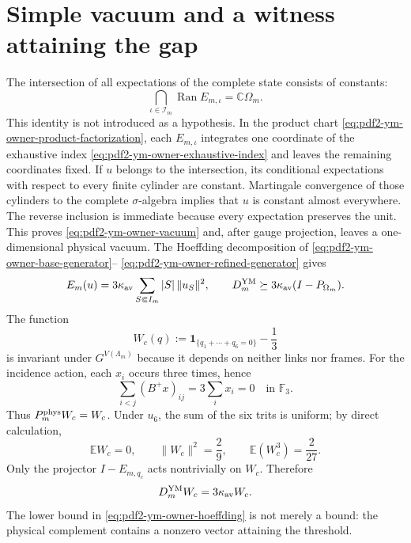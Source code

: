 \section{Simple vacuum and a witness attaining the gap}

The intersection of all expectations of the complete state consists of constants:
\begin{equation}\label{eq:pdf2-ym-owner-vacuum}
 \bigcap_{\iota\in\mathcal I_m}\operatorname{Ran}E_{m,\iota}
 =\mathbb C\Omega_m.
\end{equation}
This identity is not introduced as a hypothesis. In the product chart
\eqref{eq:pdf2-ym-owner-product-factorization}, each $E_{m,\iota}$ integrates one
coordinate of the exhaustive index
\eqref{eq:pdf2-ym-owner-exhaustive-index} and leaves the remaining coordinates fixed. If
$u$ belongs to the intersection, its conditional expectations with respect to every
finite cylinder are constant. Martingale convergence of those cylinders to the
complete $\sigma$-algebra implies that $u$ is constant almost everywhere. The reverse
inclusion is immediate because every expectation preserves the unit. This proves
\eqref{eq:pdf2-ym-owner-vacuum} and, after gauge projection, leaves a one-dimensional
physical vacuum.
The Hoeffding decomposition of
\eqref{eq:pdf2-ym-owner-base-generator}--
\eqref{eq:pdf2-ym-owner-refined-generator} gives
\begin{equation}\label{eq:pdf2-ym-owner-hoeffding}
 \widehat{\mathcal E}_m(u)
 =3\kappa_{\rm av}\sum_{S\Subset\mathcal I_m}|S|\,\|u_S\|^2,
 \qquad
 D_m^{\rm YM}\succeq
 3\kappa_{\rm av}(I-P_{\Omega_m}).
\end{equation}
The function
\begin{equation}\label{eq:pdf2-ym-owner-wc}
 W_c(q):=\mathbf1_{\{q_1+\cdots+q_6=0\}}-\frac13
\end{equation}
is invariant under $G^{V(\Lambda_m)}$ because it depends on neither links nor frames. For
the incidence action, each $x_i$ occurs three times, hence
\begin{equation}\label{eq:pdf2-ym-owner-wc-invariance}
 \sum_{i<j}(B^+x)_{ij}=3\sum_i x_i=0
 \quad\text{in }\mathbb F_3.
\end{equation}
Thus $\mathbb P_m^{\rm phys}W_c=W_c$. Under $u_6$, the sum of the six trits is
uniform; by direct calculation,
\begin{equation}\label{eq:pdf2-ym-owner-wc-moments}
 \mathbb EW_c=0,\qquad
 \|W_c\|^2=\frac29,\qquad
 \mathbb E(W_c^3)=\frac2{27}.
\end{equation}
Only the projector $I-E_{m,q_c}$ acts nontrivially on $W_c$. Therefore
\begin{equation}\label{eq:pdf2-ym-owner-wc-eigenvalue}
 D_m^{\rm YM}W_c=3\kappa_{\rm av}W_c.
\end{equation}
The lower bound in \eqref{eq:pdf2-ym-owner-hoeffding} is not merely a bound: the
physical complement contains a nonzero vector attaining the threshold.

